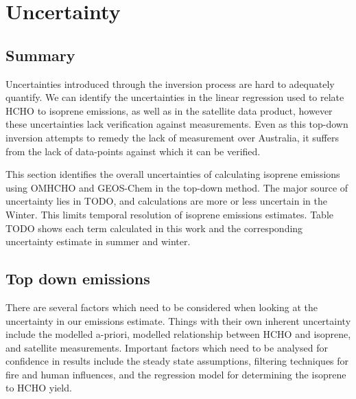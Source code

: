     

\section{Uncertainty}
\label{BioIsop:uncertainty}
  
  \subsection{Summary}
    \label{BioIsop:uncertainty:summary}
    Uncertainties introduced through the inversion process are hard to adequately quantify. 
    We can identify the uncertainties in the linear regression used to relate HCHO to isoprene emissions, as well as in the satellite data product, however these uncertainties lack verification against measurements.
    Even as this top-down inversion attempts to remedy the lack of measurement over Australia, it suffers from the lack of data-points against which it can be verified.
    
    This section identifies the overall uncertainties of calculating isoprene emissions using OMHCHO and GEOS-Chem in the top-down method.
    The major source of uncertainty lies in TODO, and calculations are more or less uncertain in the Winter.
    This limits temporal resolution of isoprene emissions estimates.
    Table TODO shows each term calculated in this work and the corresponding uncertainty estimate in summer and winter.
    
    
  
  \subsection{Top down emissions}
    \label{BioIsop:uncertainty:eomi}
    There are several factors which need to be considered when looking at the uncertainty in our emissions estimate.
    Things with their own inherent uncertainty include the modelled a-priori, modelled relationship between HCHO and isoprene, and satellite measurements.
    Important factors which need to be analysed for confidence in results include the steady state assumptions, filtering techniques for fire and human influences, and the regression model for determining the isoprene to HCHO yield.
    
